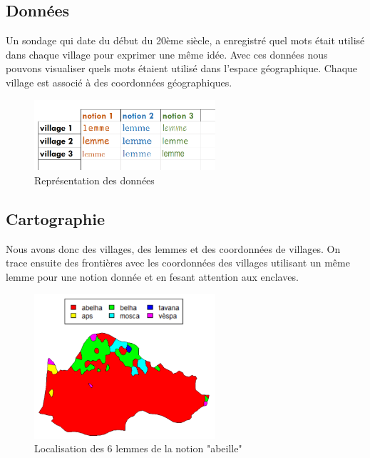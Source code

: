 \documentclass[a4paper, twoside]{article}
\begin{document}
\subsection{Données}
Un sondage qui date du début du 20ème siècle, a enregistré quel mots était 
utilisé dans chaque village pour exprimer une même idée. Avec ces données nous 
pouvons visualiser quels mots étaient utilisé dans l'espace géographique.
Chaque village est associé à des coordonnées géographiques.

\begin{figure}[h]
\caption{Représentation des données}
\centering
\includegraphics[width=0.6\textwidth]{dataframe}
\end{figure}

\subsection{Cartographie}

Nous avons donc des villages, des lemmes et des coordonnées de villages.
On trace ensuite des frontières avec les coordonnées des villages utilisant 
un même lemme pour une notion donnée et en fesant attention aux enclaves.

\begin{figure}[h]
\caption{Localisation des 6 lemmes de la notion "abeille"}
\centering
\includegraphics[width=0.6\textwidth]{notionAbeille}
\end{figure}
\end{document}
